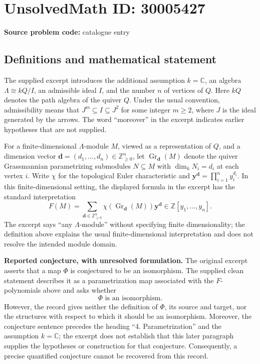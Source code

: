 \documentclass[11pt]{article}
\newcommand{\Z}{\mathbb{Z}}
\newcommand{\C}{\mathbb{C}}
\begin{document}
\section*{UnsolvedMath ID: 30005427}
\textbf{Source problem code:} catalogue entry
\subsection{Definitions and mathematical statement}
The supplied excerpt introduces the additional assumption \(k=\C\), an algebra \(\Lambda\cong kQ/I\), an admissible ideal \(I\), and the number \(n\) of vertices of \(Q\). Here \(kQ\) denotes the path algebra of the quiver \(Q\). Under the usual convention, admissibility means that \(J^m\subseteq I\subseteq J^2\) for some integer \(m\geq2\), where \(J\) is the ideal generated by the arrows. The word ``moreover'' in the excerpt indicates earlier hypotheses that are not supplied.

For a finite-dimensional \(\Lambda\)-module \(M\), viewed as a representation of \(Q\), and a dimension vector \(\mathbf d=(d_1,\ldots,d_n)\in\Z_{\geq0}^n\), let \(\operatorname{Gr}_{\mathbf d}(M)\) denote the quiver Grassmannian parametrizing submodules \(N\subseteq M\) with \(\dim_k N_i=d_i\) at each vertex \(i\). Write \(\chi\) for the topological Euler characteristic and \(\mathbf y^{\mathbf d}=\prod_{i=1}^n y_i^{d_i}\). In this finite-dimensional setting, the displayed formula in the excerpt has the standard interpretation
\[
F(M)=\sum_{\mathbf d\in\Z_{\geq0}^n}\chi\!\left(\operatorname{Gr}_{\mathbf d}(M)\right)\mathbf y^{\mathbf d}\in\Z[y_1,\ldots,y_n].
\]
The excerpt says ``any \(\Lambda\)-module'' without specifying finite dimensionality; the definition above explains the usual finite-dimensional interpretation and does not resolve the intended module domain.

\textbf{Reported conjecture, with unresolved formulation.} The original excerpt asserts that a map \(\Phi\) is conjectured to be an isomorphism. The supplied clean statement describes it as a parametrization map associated with the \(F\)-polynomials above and asks whether
\[
\Phi\text{ is an isomorphism}.
\]
However, the record gives neither the definition of \(\Phi\), its source and target, nor the structures with respect to which it should be an isomorphism. Moreover, the conjecture sentence precedes the heading ``4. Parametrization'' and the assumption \(k=\C\); the excerpt does not establish that this later paragraph supplies the hypotheses or construction for that conjecture. Consequently, a precise quantified conjecture cannot be recovered from this record.
\end{document}
